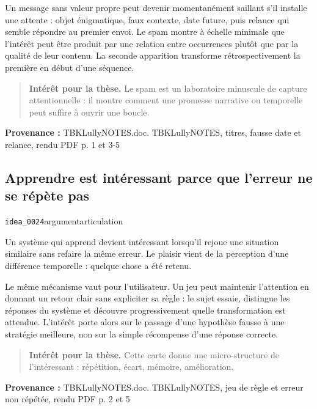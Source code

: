 \documentclass[10pt,a4paper]{article}
\begin{document}
Un message sans valeur propre peut devenir momentanément saillant s'il installe une attente : objet énigmatique, faux contexte, date future, puis relance qui semble répondre au premier envoi. Le spam montre à échelle minimale que l'intérêt peut être produit par une relation entre occurrences plutôt que par la qualité de leur contenu. La seconde apparition transforme rétrospectivement la première en début d'une séquence.

\begin{quote}
\textbf{Intérêt pour la thèse.} Le spam est un laboratoire minuscule de capture attentionnelle : il montre comment une promesse narrative ou temporelle peut suffire à ouvrir une boucle.
\end{quote}
{\footnotesize\color{metadata}\textbf{Provenance :} TBKLullyNOTES.doc. TBKLullyNOTES, titres, fausse date et relance, rendu PDF p. 1 et 3-5\par}

\subsection{Apprendre est intéressant parce que l'erreur ne se répète pas}
{\small\color{metadata} \texttt{idea\_0024}\quad\textbullet\quad argument\quad\textbullet\quad articulation\par}

Un système qui apprend devient intéressant lorsqu'il rejoue une situation similaire sans refaire la même erreur. Le plaisir vient de la perception d'une différence temporelle : quelque chose a été retenu.

Le même mécanisme vaut pour l'utilisateur. Un jeu peut maintenir l'attention en donnant un retour clair sans expliciter sa règle : le sujet essaie, distingue les réponses du système et découvre progressivement quelle transformation est attendue. L'intérêt porte alors sur le passage d'une hypothèse fausse à une stratégie meilleure, non sur la simple récompense d'une réponse correcte.

\begin{quote}
\textbf{Intérêt pour la thèse.} Cette carte donne une micro-structure de l'intéressant : répétition, écart, mémoire, amélioration.
\end{quote}
{\footnotesize\color{metadata}\textbf{Provenance :} TBKLullyNOTES.doc. TBKLullyNOTES, jeu de règle et erreur non répétée, rendu PDF p. 2 et 5\par}

\end{document}
